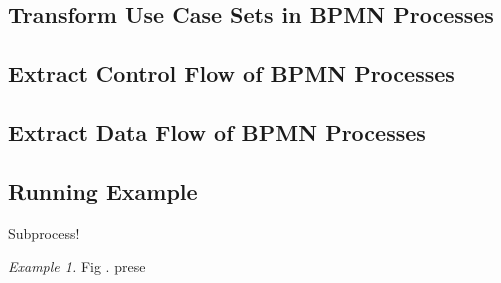 \subsection{Transform Use Case Sets in BPMN Processes}

\subsection{Extract Control Flow of BPMN Processes}

\subsection{Extract Data Flow of BPMN Processes}

\subsection{Running Example}


Subprocess!



\textit{Example 1.} Fig . prese








